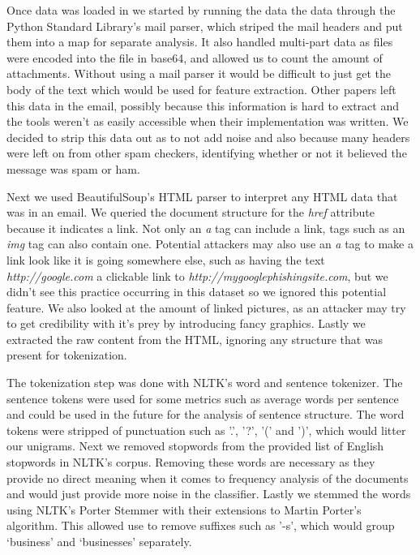 \documentclass[12pt]{article}
\begin{document}
\begin{multicols}{2}
            Once data was loaded in we started by running the data the data through
            the Python Standard Library's mail parser, which striped the mail headers
            and put them into a map for separate analysis. It also handled multi-part
            data as files were encoded into the file in base64, and allowed us to count
            the amount of attachments. Without using a mail
            parser it would be difficult to just get the body of the text which
            would be used for feature extraction. Other papers left this data in the
            email, possibly because this information is hard to extract and the tools
            weren't as easily accessible when their implementation was written. We
            decided to strip this data out as to not add noise and also because many 
            headers were left on from other spam checkers, identifying whether or not
            it believed the message was spam or ham.


            Next we used BeautifulSoup's HTML parser to interpret any HTML data that
            was in an email. We queried the document structure for the \textit{href}
            attribute because it indicates a link. Not only an \textit{a} tag can include
            a link, tags such as an \textit{img} tag can also contain one. Potential attackers
            may also use an \textit{a} tag to make a link look like it is going somewhere else,
            such as having the text \textit{http://google.com} a clickable link to
            \textit{http://mygooglephishingsite.com}, but we didn't see this practice 
            occurring in this dataset so we ignored this potential feature. We also looked at the
            amount of linked pictures, as an attacker may try to get credibility with it's prey
            by introducing fancy graphics. Lastly we extracted the raw content from the HTML,
            ignoring any structure that was present for tokenization.


            The tokenization step was done with NLTK's word and sentence tokenizer.
            The sentence tokens were used for some metrics such as average words per
            sentence and could be used in the future for the analysis of sentence
            structure. The word tokens were stripped of punctuation such as '.',
            '?', '(' and ')', which would litter our unigrams. Next we removed stopwords
            from the provided list of English stopwords in NLTK's corpus. Removing
            these words are necessary as they provide no direct meaning when it comes
            to frequency analysis of the documents and would just provide more noise
            in the classifier. Lastly we
            stemmed the words using NLTK's Porter Stemmer with their extensions to
            Martin Porter's algorithm. This allowed use to remove suffixes such as '-s',
            which would group `business' and `businesses' separately.



\end{multicols}
\end{document}
